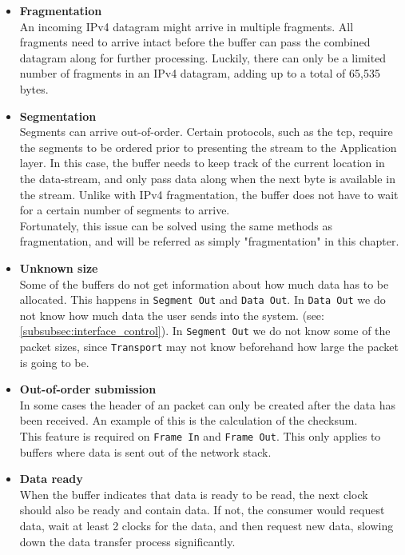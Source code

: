 \begin{itemize}
\item \textbf{Fragmentation}\\
    An incoming IPv4 datagram might arrive in multiple
fragments. All fragments need to arrive intact before the buffer can pass the
combined datagram along for further processing. Luckily, there can only be a
limited number of fragments in an IPv4 datagram, adding up to a total of 65,535
bytes.

\item \textbf{Segmentation}\\
Segments can arrive out-of-order. Certain protocols, such as the \gls{tcp},
require the segments to be ordered prior to presenting the stream to the
Application layer.
In this case, the buffer needs to keep track of the current location in the
data-stream, and only pass data along when the next byte is available in the
stream. Unlike with IPv4 fragmentation, the buffer does not have to wait for a
certain number of segments to arrive.\\
Fortunately, this issue can be solved using the same methods as fragmentation,
and will be referred as simply "fragmentation" in this chapter.

    \item \textbf{Unknown size}\\
    Some of the buffers do not get information about how much data has to be
    allocated. This happens in \texttt{Segment Out} and \texttt{Data Out}.
    In \texttt{Data Out} we do not know how much data the user sends into
    the system. (see: \autoref{subsubsec:interface_control}). In
    \texttt{Segment Out} we do not know some of the packet sizes, since
    \texttt{Transport} may not know beforehand how large the packet is going to
    be.

    \item \textbf{Out-of-order submission}\\
    In some cases the header of an packet can only be created after the data
    has been received. An example of this is the calculation of the checksum.\\
    This feature is required on \texttt{Frame In} and \texttt{Frame Out}.
    This only applies to buffers where data is sent out of the network stack.

    \item \textbf{Data ready}\\
    When the buffer indicates that data is ready to be read, the next clock
    should also be ready and contain data. If not, the consumer would request
    data, wait at least 2 clocks for the data, and then request new data,
    slowing down the data transfer process significantly.

\end{itemize}
